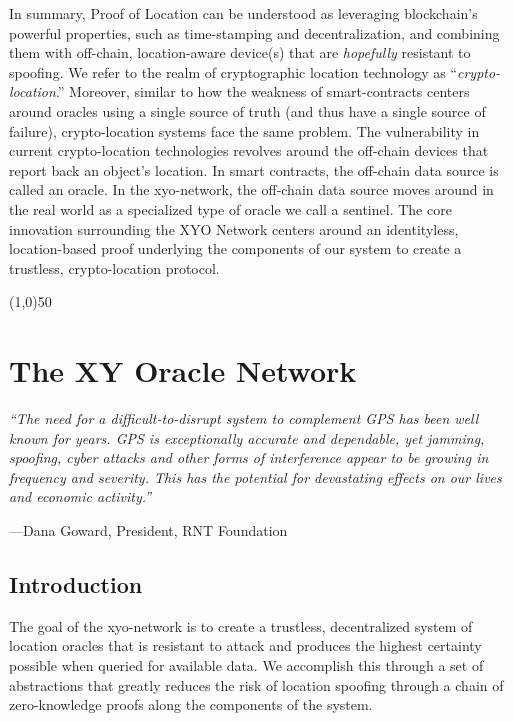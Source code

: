 \documentclass{article}
\begin{document}
In summary, Proof of Location can be understood as leveraging blockchain's powerful properties, such as time-stamping and decentralization, and combining them with off-chain, location-aware device(s) that are \textit{hopefully} resistant to spoofing. We refer to the realm of cryptographic location technology as ``\textit{\gls{crypto-location}}.'' Moreover, similar to how the weakness of \glspl{smart-contract} centers around \glspl{oracle} using a single source of truth (and thus have a single source of failure), crypto-location systems face the same problem. The vulnerability in current crypto-location technologies revolves around the off-chain devices that report back an object's location. In smart contracts, the off-chain data source is called an oracle. In the \Gls{xyo-network}, the off-chain data source moves around in the real world as a specialized type of oracle we call a \Gls{sentinel}. The core innovation surrounding the XYO Network centers around an identityless, location-based proof underlying the components of our system to create a \gls{trustless}, crypto-location protocol.
\begin{center}
\line(1,0){50}
\end{center}

\section {The XY Oracle Network}

\begin{displayquote}\textit{``The need for a difficult-to-disrupt system to complement GPS has been well known for years. GPS is exceptionally accurate and dependable, yet jamming, spoofing, cyber attacks and other forms of interference appear to be growing in frequency and severity. This has the potential for devastating effects on our lives and economic activity.''} \cite{goward-resiliant}

\vspace{2mm}
---Dana Goward, President, RNT Foundation
\end{displayquote}

\subsection{Introduction}
The goal of the \Gls{xyo-network} is to create a \gls{trustless}, decentralized system of location \glspl{oracle} that is resistant to attack and produces the highest \gls{certainty} possible when queried for available data. We accomplish this through a set of abstractions that greatly reduces the risk of location spoofing through a chain of zero-knowledge proofs along the components of the system.
\end{document}
